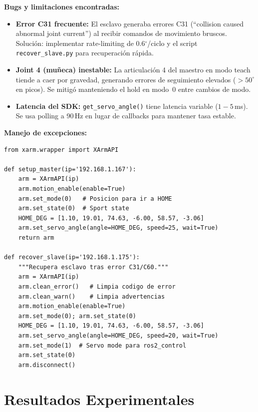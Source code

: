 \documentclass[journal,10pt,twoside]{IEEEtran}
\begin{document}
\textbf{Bugs y limitaciones encontradas:}
\begin{itemize}
  \item \textbf{Error C31 frecuente:} El esclavo generaba errores C31
        (``collision caused abnormal joint current'') al recibir
        comandos de movimiento bruscos. Solución: implementar
        rate-limiting de 0.6$^\circ$/ciclo y el script
        \texttt{recover\_slave.py} para recuperación rápida.
  \item \textbf{Joint 4 (muñeca) inestable:} La articulación 4 del
        maestro en modo teach tiende a caer por gravedad, generando
        errores de seguimiento elevados ($>50^\circ$ en picos). Se
        mitigó manteniendo el hold en modo~0 entre cambios de modo.
  \item \textbf{Latencia del SDK:} \texttt{get\_servo\_angle()} tiene
        latencia variable ($1{-}5$\,ms). Se usa polling a 90\,Hz
        en lugar de callbacks para mantener tasa estable.
\end{itemize}

\textbf{Manejo de excepciones:}

\begin{lstlisting}[caption={Configuración y manejo de errores del xArm},
                   label={lst:setup}]
from xarm.wrapper import XArmAPI

def setup_master(ip='192.168.1.167'):
    arm = XArmAPI(ip)
    arm.motion_enable(enable=True)
    arm.set_mode(0)   # Posicion para ir a HOME
    arm.set_state(0)  # Sport state
    HOME_DEG = [1.10, 19.01, 74.63, -6.00, 58.57, -3.06]
    arm.set_servo_angle(angle=HOME_DEG, speed=25, wait=True)
    return arm

def recover_slave(ip='192.168.1.175'):
    """Recupera esclavo tras error C31/C60."""
    arm = XArmAPI(ip)
    arm.clean_error()   # Limpia codigo de error
    arm.clean_warn()    # Limpia advertencias
    arm.motion_enable(enable=True)
    arm.set_mode(0); arm.set_state(0)
    HOME_DEG = [1.10, 19.01, 74.63, -6.00, 58.57, -3.06]
    arm.set_servo_angle(angle=HOME_DEG, speed=20, wait=True)
    arm.set_mode(1)  # Servo mode para ros2_control
    arm.set_state(0)
    arm.disconnect()
\end{lstlisting}

\section{Resultados Experimentales}
\label{sec:experiments}
\end{document}
